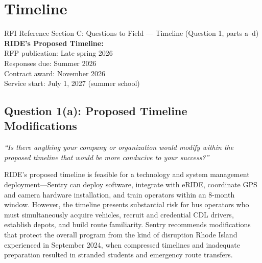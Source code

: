 \section{\texorpdfstring{\color{MidnightBlue}Timeline}{Timeline}}

\begin{sidebar}{RFI Reference}
Section C: Questions to Field --- Timeline (Question 1, parts a--d)\\[0.3cm]
\textbf{RIDE's Proposed Timeline:}\\
RFP publication: Late spring 2026\\
Responses due: Summer 2026\\
Contract award: November 2026\\
Service start: July 1, 2027 (summer school)
\end{sidebar}

\subsection{Question 1(a): Proposed Timeline Modifications}
\textit{``Is there anything your company or organization would modify within the proposed timeline that would be more conducive to your success?''}

\vspace{0.3cm}

RIDE's proposed timeline is feasible for a technology and system management deployment---Sentry can deploy software, integrate with eRIDE, coordinate GPS and camera hardware installation, and train operators within an 8-month window. However, the timeline presents substantial risk for bus operators who must simultaneously acquire vehicles, recruit and credential CDL drivers, establish depots, and build route familiarity. Sentry recommends modifications that protect the overall program from the kind of disruption Rhode Island experienced in September 2024, when compressed timelines and inadequate preparation resulted in stranded students and emergency route transfers.

